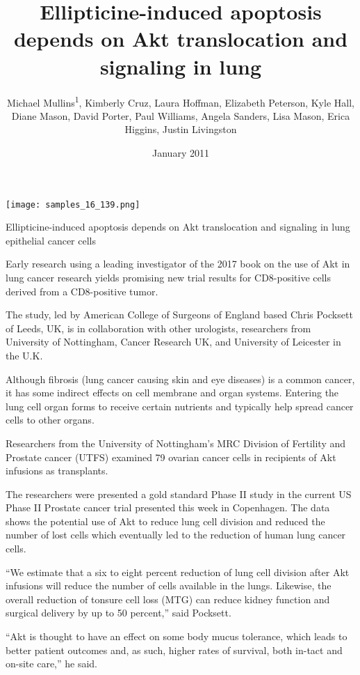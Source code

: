 \documentclass{article}
\title{Ellipticine-induced apoptosis depends on Akt translocation and signaling in lung}
\author{Michael Mullins\textsuperscript{1},  Kimberly Cruz,  Laura Hoffman,  Elizabeth Peterson,  Kyle Hall,  Diane Mason,  David Porter,  Paul Williams,  Angela Sanders,  Lisa Mason,  Erica Higgins,  Justin Livingston}
\affil{\textsuperscript{1}Obihiro University of Agriculture and Veterinary Medicine}
\date{January 2011}
\begin{document}
\maketitle

\begin{center}
\begin{minipage}{0.75\linewidth}
\texttt{[image: samples\_16\_139.png]}
\end{minipage}
\end{center}

Ellipticine-induced apoptosis depends on Akt translocation and signaling in lung epithelial cancer cells

Early research using a leading investigator of the 2017 book on the use of Akt in lung cancer research yields promising new trial results for CD8-positive cells derived from a CD8-positive tumor.

The study, led by American College of Surgeons of England based Chris Pocksett of Leeds, UK, is in collaboration with other urologists, researchers from University of Nottingham, Cancer Research UK, and University of Leicester in the U.K.

Although fibrosis (lung cancer causing skin and eye diseases) is a common cancer, it has some indirect effects on cell membrane and organ systems. Entering the lung cell organ forms to receive certain nutrients and typically help spread cancer cells to other organs.

Researchers from the University of Nottingham’s MRC Division of Fertility and Prostate cancer (UTFS) examined 79 ovarian cancer cells in recipients of Akt infusions as transplants.

The researchers were presented a gold standard Phase II study in the current US Phase II Prostate cancer trial presented this week in Copenhagen. The data shows the potential use of Akt to reduce lung cell division and reduced the number of lost cells which eventually led to the reduction of human lung cancer cells.

“We estimate that a six to eight percent reduction of lung cell division after Akt infusions will reduce the number of cells available in the lungs. Likewise, the overall reduction of tonsure cell loss (MTG) can reduce kidney function and surgical delivery by up to 50 percent,” said Pocksett.

“Akt is thought to have an effect on some body mucus tolerance, which leads to better patient outcomes and, as such, higher rates of survival, both in-tact and on-site care,” he said.
\end{document}
